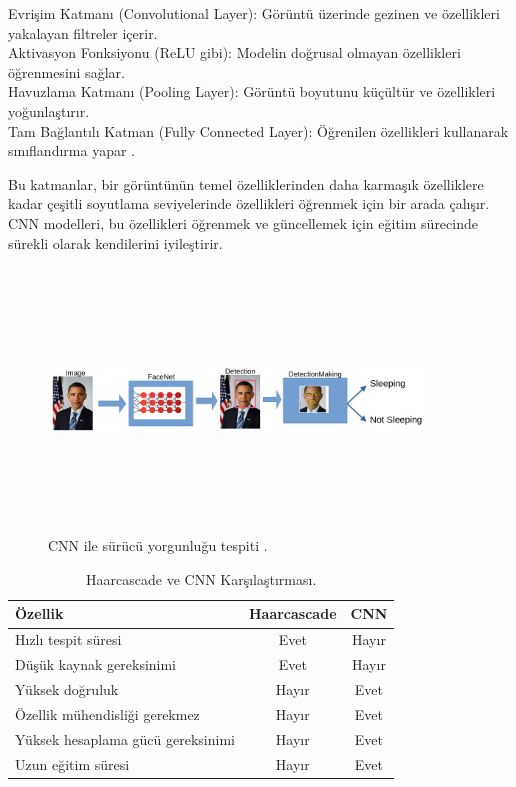 \documentclass[12pt, a4paper]{article}
\begin{document}
Evrişim Katmanı (Convolutional Layer): Görüntü üzerinde gezinen ve özellikleri yakalayan filtreler içerir.\\
Aktivasyon Fonksiyonu (ReLU gibi): Modelin doğrusal olmayan özellikleri öğrenmesini sağlar.\\
Havuzlama Katmanı (Pooling Layer): Görüntü boyutunu küçültür ve özellikleri yoğunlaştırır.\\
Tam Bağlantılı Katman (Fully Connected Layer): Öğrenilen özellikleri kullanarak sınıflandırma yapar \cite{cnnnedirtek}.\par
 Bu katmanlar, bir görüntünün temel özelliklerinden daha karmaşık özelliklere kadar çeşitli soyutlama seviyelerinde özellikleri öğrenmek için bir arada çalışır. CNN modelleri, bu özellikleri öğrenmek ve güncellemek için eğitim sürecinde sürekli olarak kendilerini iyileştirir.\par
 \begin{figure}
 	\centering
 	\includegraphics[width=10cm, height=7cm, keepaspectratio]{process.png}
 	\caption{CNN ile sürücü yorgunluğu tespiti \cite{eadali}.}
 \end{figure} 
 \begin{table}[h!]
 	\begin{center}
 		\caption{Haarcascade ve CNN Karşılaştırması.}
 		\label{tab:table1}
 		\begin{tabular}{l|c|c|}
 			\textbf{Özellik} & \textbf{Haarcascade} & \textbf{CNN}\\
 			\hline
 			Hızlı tespit süresi & Evet & Hayır\\
 			Düşük kaynak gereksinimi & Evet & Hayır\\
 			Yüksek doğruluk & Hayır & Evet\\
 			Özellik mühendisliği gerekmez & Hayır & Evet\\
 			Yüksek hesaplama gücü gereksinimi & Hayır & Evet\\
 			Uzun eğitim süresi & Hayır & Evet\\
 		\end{tabular}
 	\end{center}
 \end{table}
\end{document}
